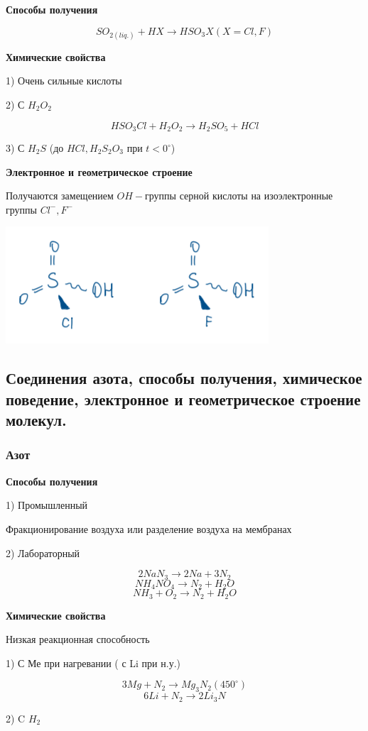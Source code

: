 \documentclass[14pt,a4paper]{scrartcl}
\begin{document}
\textbf{Способы получения}

$$SO_{2(liq.)} + HX \rightarrow HSO_3X(X=Cl,F)$$

\textbf{Химические свойства}

1) Очень сильные кислоты

2) С $H_2O_2$

$$HSO_3Cl + H_2O_2 \rightarrow H_2SO_5 + HCl$$

3) С $H_2S$ (до $HCl, H_2S_2O_3$ при $t<0^{\circ}$) 


\textbf{Электронное и геометрическое строение}

Получаются замещением $OH-$группы серной кислоты на изоэлектронные группы $Cl^-, F^-$

\includegraphics{7v11.png}

\subsection{Соединения азота, способы получения, химическое поведение, электронное и геометрическое строение молекул.}

\subsubsection{Азот}

\textbf{Способы получения}

1) Промышленный

Фракционирование воздуха или разделение воздуха на мембранах

2) Лабораторный

$$2NaN_3 \rightarrow 2Na + 3N_2$$
$$NH_4NO_4 \rightarrow N_2 + H_2O$$
$$NH_3 + O_2 \rightarrow N_2 + H_2O$$

\textbf{Химические свойства}

Низкая реакционная способность

1) С Ме при нагревании ( с Li при н.у.)

$$3Mg + N_2 \rightarrow Mg_3N_2 (450^{\circ})$$
$$6Li + N_2 \rightarrow 2Li_3N$$

2) C $H_2$
\end{document}
